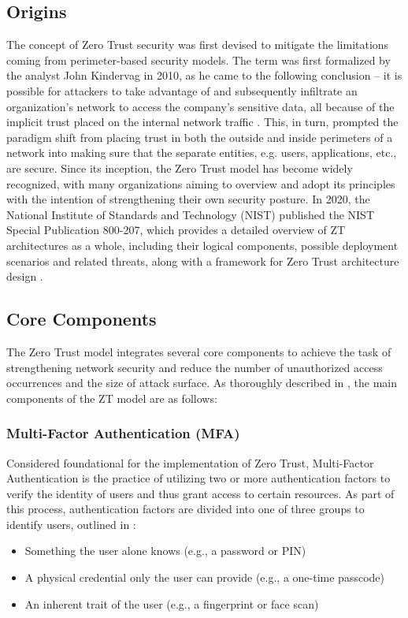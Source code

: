 \subsection{Origins}
The concept of Zero Trust security was first devised to mitigate the limitations coming from perimeter-based security models. The term was first formalized by the analyst John Kindervag in 2010, as he came to the following conclusion -- it is possible for attackers to take advantage of and subsequently infiltrate an organization's network to access the company's sensitive data, all because of the implicit trust placed on the internal network traffic \cite{zt_origins_article}. This, in turn, prompted the paradigm shift from placing trust in both the outside and inside perimeters of a network into making sure that the separate entities, e.g. users, applications, etc., are secure.
Since its inception, the Zero Trust model has become widely recognized, with many organizations aiming to overview and adopt its principles with the intention of strengthening their own security posture. In 2020, the National Institute of Standards and Technology (NIST) published the NIST Special Publication 800-207, which provides a detailed overview of ZT architectures as a whole, including their logical components, possible deployment scenarios and related threats, along with a framework for Zero Trust architecture design \cite{zero-trust-nist-rose-2020}.

\subsection{Core Components}
The Zero Trust model integrates several core components to achieve the task of strengthening network security and reduce the number of unauthorized access occurrences and the size of attack surface. As thoroughly described in \cite{zt_origins_article}, the main components of the ZT model are as follows:

\subsubsection{Multi-Factor Authentication (MFA)}
Considered foundational for the implementation of Zero Trust, Multi-Factor Authentication is the practice of utilizing two or more authentication factors to verify the identity of users and thus grant access to certain resources. As part of this process, authentication factors are divided into one of three groups to identify users, outlined in \cite{gilman_zero_2017}:
\begin{itemize}
    \item Something the user alone knows (e.g., a password or PIN)
    \item A physical credential only the user can provide (e.g., a one-time passcode)
    \item An inherent trait of the user (e.g., a fingerprint or face scan)
\end{itemize}

